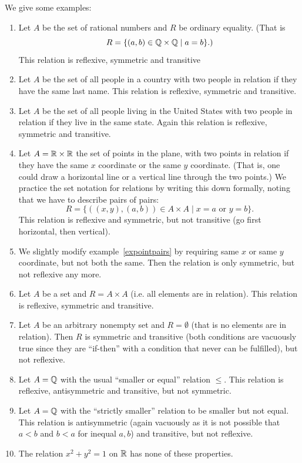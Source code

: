 We give some examples: 
\begin{enumerate}
\item
Let $A$ be the set of rational numbers and $R$ be ordinary equality. (That is 
\[
R=\{(a,b)\in{\mathbb Q}\times{\mathbb Q}\mid a=b\}.)
\]
This relation is reflexive, symmetric and transitive
\item
Let $A$ be the set of all people in a country with two people in relation if they have
the same last name. This relation is reflexive, symmetric and transitive.
\item
Let $A$ be the set of all people living in the United States
 with two people in
relation if they live in the same state. Again this relation is reflexive, symmetric and
transitive.
\item
\label{expointpairs}
Let $A={\mathbb R}\times{\mathbb R}$ the set of points in the plane, with two points in relation
if they have the same $x$ coordinate or the same $y$ coordinate. (That is, one could
draw a horizontal line or a vertical line through the two points.)
We practice the set notation for relations by writing this down formally, noting that
we have to describe pairs of pairs:
\[
R=\{((x,y),(a,b))\in A\times A\mid x=a \mbox{\ or\ }y=b\}.
\]
This relation is reflexive and symmetric, but not transitive (go first horizontal, then
vertical).
\item
We slightly modify example~\ref{expointpairs} by requiring same $x$ or same $y$
coordinate, but not both the same. Then the relation is only symmetric, but not
reflexive any more.
\item
Let $A$ be a set and $R=A\times A$ (i.e. all elements are in relation). This relation
is reflexive, symmetric and transitive.
\item
Let $A$ be an arbitrary nonempty set and $R=\emptyset$ (that is no elements are in
relation). Then $R$ is symmetric and transitive (both conditions are vacuously true
since they are ``if-then'' with a condition that never can be fulfilled), but not
reflexive.
\item Let $A={\mathbb Q}$ with the usual ``smaller or equal'' relation $\le$. This relation is
reflexive, antisymmetric and transitive, but not symmetric.
\item Let $A={\mathbb Q}$ with the ``strictly smaller'' relation to be smaller but not equal. 
This relation is antisymmetric (again vacuously as it is not possible that $a<b$ and
$b<a$ for inequal $a,b$) and transitive, but not reflexive.
\item The relation $x^2+y^2=1$ on ${\mathbb R}$ has none of these properties.
\end{enumerate}

